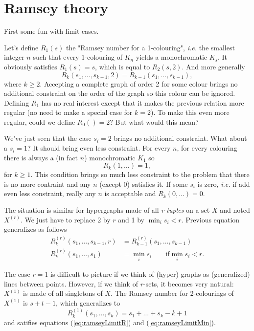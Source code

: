 \section{Ramsey theory}

First some fun with limit cases.

Let's define $R_1(s)$ the "Ramsey number for a 1-colouring",
\textit{i.e.} the smallest integer $n$ such that every 1-colouring of $K_n$ yields a monochromatic $K_s$.
It obviously satisfies $R_1(s) = s$, which is equal to $R_2(s,2)$. And more generally
\begin{equation}
    R_k(s_1,\dots,s_{k-1},2) = R_{k-1}(s_1,\dots,s_{k-1}) ,
\end{equation}
where $k \geq 2$. Accepting a complete graph of order 2 for some colour brings no additional constraint on the order of the graph so this colour can be ignored.
Defining $R_1$ has no real interest except that it makes the previous relation more regular (no need to make a special case for $k=2$).
To make this even more regular, could we define $R_0() = 2$? But what would this mean?

We've just seen that the case $s_i = 2$ brings no additional constraint. What about a $s_i = 1$? It should bring even less constraint.
For every $n$, for every colouring there is always a (in fact $n$) monochromatic $K_1$ so
\begin{equation}
    R_k(1,\dots)=1 ,
\end{equation}
for $k \geq 1$.
This condition brings so much less constraint to the problem that there is no more contraint and any $n$ (except 0) satisfies it.
If some $s_i$ is zero, \textit{i.e.} if add even less constraint, really any $n$ is acceptable and $R_k(0,\dots) = 0$.

The situation is similar for hypergraphs made of all \emph{r-tuples} on a set $X$ and noted $X^{(r)}$.
We just have to replace 2 by $r$ and 1 by $\min_i s_i < r$.
Previous equation generalizes as follows
\begin{align}
    \label{eq:ramseyLimitR}
    R_k^{(r)}(s_1,\dots,s_{k-1},r) & = R_{k-1}^{(r)}(s_1,\dots,s_{k-1}) \\
    \label{eq:ramseyLimitMin}
    R_k^{(r)}(s_1,\dots,s_1) & = \min_i s_i \qquad \text{if} \min_i s_i < r .
\end{align}

The case $r = 1$ is difficult to picture if we think of (hyper) graphs as (generalized) lines between points.
However, if we think of $r$-sets, it becomes very natural: $X^{(1)}$ is made of all singletons of $X$.
The Ramsey number for 2-colourings of $X^{(1)}$ is $s+t-1$, which generalizes to
\begin{equation}
    \label{eq:ramseyLimitR1}
    R_k^{(1)}(s_1,\dots,s_k) = s_1 + \dots + s_k - k + 1
\end{equation}
and satifies equations (\ref{eq:ramseyLimitR}) and (\ref{eq:ramseyLimitMin}).


